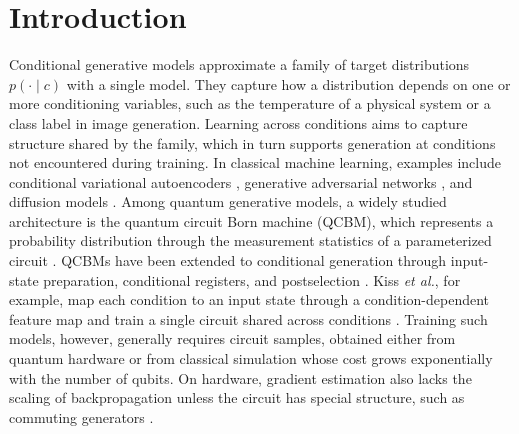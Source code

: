 \documentclass[pra,aps,10pt,twocolumn,floatfix,superscriptaddress, notitlepage,longbibliography]{revtex4-2}
\begin{document}
\section{Introduction}
Conditional generative models approximate a family of target distributions $p(\cdot\mid c)$ with a single model. They capture how a distribution depends on one or more conditioning variables, such as the temperature of a physical system or a class label in image generation. Learning across conditions aims to capture structure shared by the family, which in turn supports generation at conditions not encountered during training. In classical machine learning, examples include conditional variational autoencoders \cite{sohnConditionalGenerative2015, walkerUncertainFutureForecasting2016, yanAttribute2ImageConditionalImage2016}, generative adversarial networks \cite{mirzaConditionalGAN2014, miyatoCGANsProjectionDiscriminator2018, isolaImagetoImageTranslationConditional2018}, and diffusion models \cite{hoClassifierFreeDiffusionGuidance2022, dhariwalDiffusionModelsBeat2021}. Among quantum generative models, a widely studied architecture is the quantum circuit Born machine (QCBM), which represents a probability distribution through the measurement statistics of a parameterized circuit \cite{benedettiGenerativeModeling2019,liuDifferentiableLearning2018}. QCBMs have been extended to conditional generation through input-state preparation, conditional registers, and postselection \cite{heConditionalGenerativeModel2019,kissConditionalBornMachine2022,zengConditionalQCBM2023,zengLearningInferenceGenerative2019,certoConditionalGenerativeModels2023}. Kiss \textit{et al.}, for example, map each condition to an input state through a condition-dependent feature map and train a single circuit shared across conditions \cite{kissConditionalBornMachine2022}. Training such models, however, generally requires circuit samples, obtained either from quantum hardware or from classical simulation whose cost grows exponentially with the number of qubits. On hardware, gradient estimation also lacks the scaling of backpropagation unless the circuit has special structure, such as commuting generators \cite{bowlesBackpropagationScaling2025}.
\end{document}
